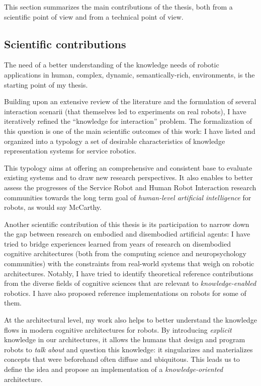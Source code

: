 This section summarizes the main contributions of the thesis, both from a
scientific point of view and from a technical point of view.

\subsection{Scientific contributions}
\label{sect|scientific-contributions}

The need of a better understanding of the knowledge needs of robotic
applications in human, \ie complex, dynamic, semantically-rich, environments,
is the starting point of my thesis.

Building upon an extensive review of the literature and the formulation of
several interaction scenarii (that themselves led to experiments on real
robots), I have iteratively refined the ``knowledge for interaction'' problem.
The formalization of this question is one of the main scientific outcomes of
this work: I have listed and organized into a typology a set of desirable
characteristics of knowledge representation systems for service robotics.

This typology aims at offering an comprehensive and consistent base to evaluate
existing systems and to draw new research perspectives. It also enables to
better assess the progresses of the Service Robot and Human Robot Interaction
research communities towards the long term goal of \emph{human-level artificial
intelligence} for robots, as would say McCarthy.

Another scientific contribution of this thesis is its participation to
narrow down the gap between research on embodied and disembodied artificial
agents: I have tried to bridge experiences learned from years of research on
disembodied cognitive architectures (both from the computing science and
neuropsychology communities) with the constraints from real-world systems that
weigh on robotic architectures. Notably, I have tried to identify
theoretical reference contributions from the diverse fields of cognitive
sciences that are relevant to \emph{knowledge-enabled} robotics. I have also
proposed reference implementations on robots for some of them.

At the architectural level, my work also helps to better understand the
knowledge flows in modern cognitive architectures for robots. By introducing
\emph{explicit} knowledge in our architectures, it allows the humans that
design and program robots to \emph{talk about} and question this knowledge: it
singularizes and materializes concepts that were beforehand often
diffuse and ubiquitous. This leads us to define the idea and propose an
implementation of a \emph{knowledge-oriented} architecture.

